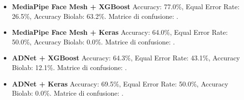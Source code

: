 \documentclass[12pt,a4paper,openright,twoside]{book}
\begin{document}
\begin{itemize}
    \item \textbf{MediaPipe Face Mesh + XGBoost}  
    Accuracy: 77.0\%,  Equal Error Rate: 26.5\%,  Accuracy Biolab: 63.2\%.  
    Matrice di confusione: .
    
    \item \textbf{MediaPipe Face Mesh + Keras}  
    Accuracy: 64.0\%,  Equal Error Rate: 50.0\%,  Accuracy Biolab: 0.0\%.  
    Matrice di confusione: .
    
    \item \textbf{ADNet + XGBoost}  
    Accuracy: 64.3\%,  Equal Error Rate: 43.1\%,  Accuracy Biolab: 12.1\%.  
    Matrice di confusione: .
    
    \item \textbf{ADNet + Keras}  
    Accuracy: 69.5\%,  Equal Error Rate: 50.0\%,  Accuracy Biolab: 0.0\%.  
    Matrice di confusione: .
\end{itemize}
\end{document}
